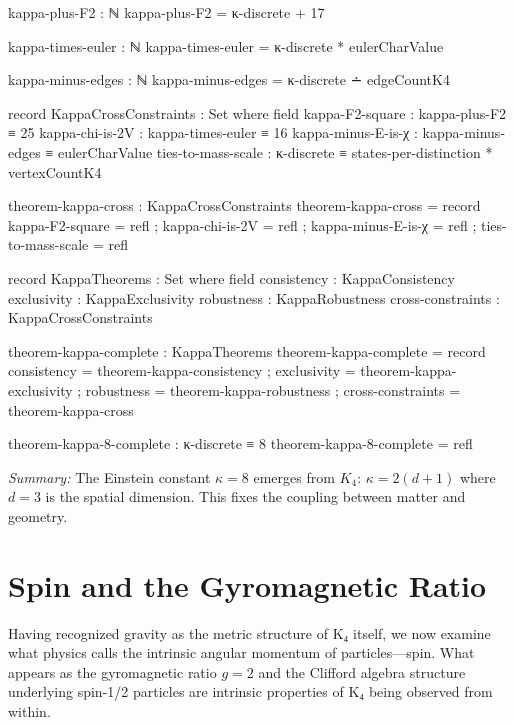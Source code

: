 \documentclass[11pt,a4paper]{book}
\begin{document}
\begin{code}
kappa-plus-F2 : ℕ
kappa-plus-F2 = κ-discrete + 17

kappa-times-euler : ℕ
kappa-times-euler = κ-discrete * eulerCharValue

kappa-minus-edges : ℕ
kappa-minus-edges = κ-discrete ∸ edgeCountK4

record KappaCrossConstraints : Set where
  field
    kappa-F2-square     : kappa-plus-F2 ≡ 25
    kappa-chi-is-2V     : kappa-times-euler ≡ 16
    kappa-minus-E-is-χ  : kappa-minus-edges ≡ eulerCharValue
    ties-to-mass-scale  : κ-discrete ≡ states-per-distinction * vertexCountK4

theorem-kappa-cross : KappaCrossConstraints
theorem-kappa-cross = record
  { kappa-F2-square     = refl
  ; kappa-chi-is-2V     = refl
  ; kappa-minus-E-is-χ  = refl
  ; ties-to-mass-scale  = refl
  }

record KappaTheorems : Set where
  field
    consistency      : KappaConsistency
    exclusivity      : KappaExclusivity
    robustness       : KappaRobustness
    cross-constraints : KappaCrossConstraints

theorem-kappa-complete : KappaTheorems
theorem-kappa-complete = record
  { consistency      = theorem-kappa-consistency
  ; exclusivity      = theorem-kappa-exclusivity
  ; robustness       = theorem-kappa-robustness
  ; cross-constraints = theorem-kappa-cross
  }

theorem-kappa-8-complete : κ-discrete ≡ 8
theorem-kappa-8-complete = refl
\end{code}

\medskip
\noindent\textit{Summary:} The Einstein constant $\kappa = 8$ emerges from $K_4$: 
$\kappa = 2(d+1)$ where $d=3$ is the spatial dimension. This fixes the coupling 
between matter and geometry.


\chapter{Spin and the Gyromagnetic Ratio}
\label{chap:spin-gyromagnetic}

Having recognized gravity as the metric structure of K₄ itself, we now examine what physics calls the intrinsic angular momentum of particles—spin. What appears as the gyromagnetic ratio $g=2$ and the Clifford algebra structure underlying spin-1/2 particles are intrinsic properties of K₄ being observed from within.
\end{document}
